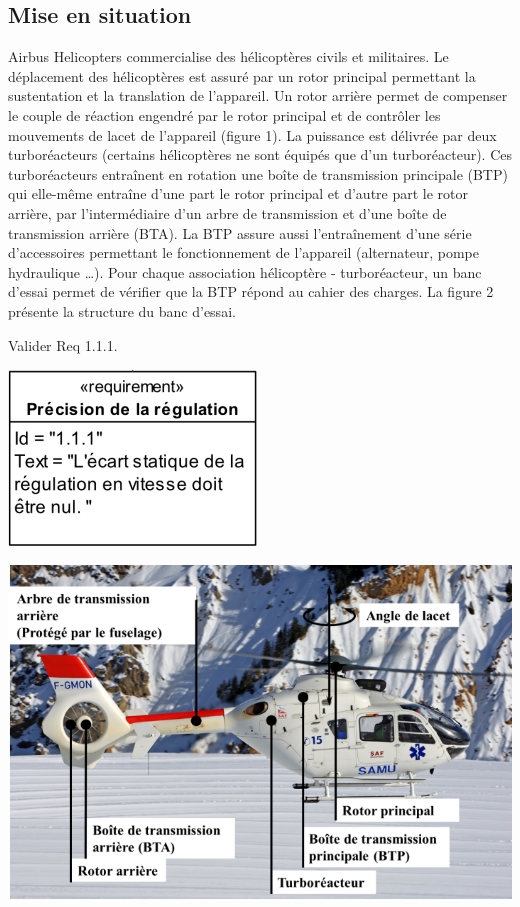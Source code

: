 \documentclass[10pt,fleqn]{article} %
\begin{document}

\vspace{5cm}
\pagestyle{fancy}
\thispagestyle{plain}

\setlength{\columnseprule}{0.4pt}
\begin{multicols}{2}

\section*{Mise en situation}
Airbus Helicopters commercialise des hélicoptères civils et militaires. Le déplacement des hélicoptères est assuré par un rotor principal permettant la sustentation et la translation de l'appareil. Un rotor arrière permet de compenser le couple de réaction engendré par le rotor principal et de contrôler les mouvements de lacet de l'appareil (figure 1).
La puissance est délivrée par deux turboréacteurs (certains hélicoptères ne sont équipés que d'un turboréacteur). Ces turboréacteurs entraînent en rotation une boîte de transmission principale (BTP) qui elle-même entraîne d'une part le rotor principal et d'autre part le rotor arrière, par l'intermédiaire d'un arbre de transmission et d'une boîte de transmission arrière (BTA). La BTP assure aussi l'entraînement d'une série d'accessoires permettant le fonctionnement de l'appareil (alternateur, pompe hydraulique …).
Pour chaque association hélicoptère - turboréacteur, un banc d'essai permet de vérifier que la BTP répond au cahier des charges. La figure 2 présente la structure du banc d'essai.

\begin{obj}
	Valider Req 1.1.1.
\end{obj}


\begin{center}
\includegraphics[width=.5\linewidth]{images/fig_02_bis}

\end{center}

\begin{center}
\includegraphics[width=.8\linewidth]{images/fig_03}


\end{center}
\end{multicols}
\end{document}
